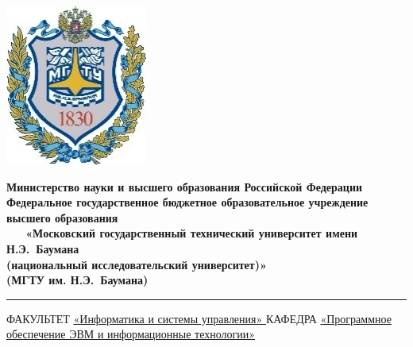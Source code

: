	\begin{titlepage}
		\fontsize{12pt}{12pt}\selectfont
		\noindent \begin{minipage}{0.15\textwidth}
			\includegraphics[width=\linewidth]{img/logo}
		\end{minipage}
		\noindent \begin{minipage}{0.9\textwidth}\centering
			\textbf{Министерство науки и высшего образования Российской Федерации}\\
			\textbf{Федеральное государственное бюджетное образовательное учреждение высшего образования}\\
			\textbf{~~~«Московский государственный технический университет имени Н.Э.~Баумана}\\
			\textbf{(национальный исследовательский университет)»}\\
			\textbf{(МГТУ им. Н.Э.~Баумана)}
		\end{minipage}
		
		\noindent\rule{18cm}{3pt}
		\newline\newline
		\noindent ФАКУЛЬТЕТ \uline{«Информатика и системы управления» \hfill}
		\newline\newline
		\noindent КАФЕДРА \uline{«Программное обеспечение ЭВМ и информационные технологии» \hfill}
		\newline\newline
		

\end{titlepage}
